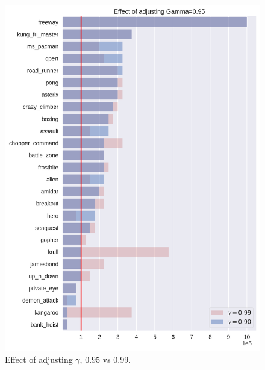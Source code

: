\begin{figure}
\centering
\includegraphics[width=0.9\columnwidth]{figures/eval_sd_g95.png}
\caption{Effect of adjusting $\gamma$, $0.95$ vs $0.99$.} 
\label{fig:adj_gamma_2}
\end{figure}

